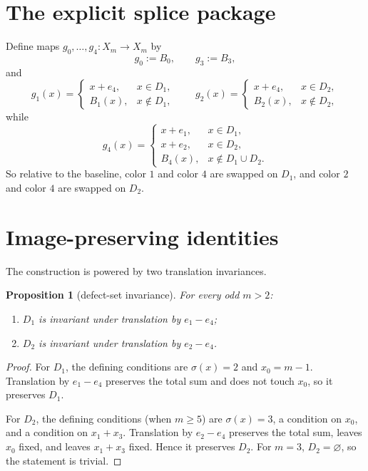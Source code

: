 \documentclass[11pt]{article}
\newtheorem{proposition}[theorem]{Proposition}
\begin{document}
\section{The explicit splice package}
Define maps \(g_0,\dots,g_4\colon X_m\to X_m\) by
\[
g_0:=B_0,\qquad g_3:=B_3,
\]
and
\[
g_1(x)=
\begin{cases}
x+e_4, & x\in D_1,\\
B_1(x), & x\notin D_1,
\end{cases}
\qquad
g_2(x)=
\begin{cases}
x+e_4, & x\in D_2,\\
B_2(x), & x\notin D_2,
\end{cases}
\]
while
\[
g_4(x)=
\begin{cases}
x+e_1, & x\in D_1,\\
x+e_2, & x\in D_2,\\
B_4(x), & x\notin D_1\cup D_2.
\end{cases}
\]
So relative to the baseline, color \(1\) and color \(4\) are swapped on \(D_1\),
and color \(2\) and color \(4\) are swapped on \(D_2\).

\section{Image-preserving identities}
The construction is powered by two translation invariances.

\begin{proposition}[defect-set invariance]
\label{prop:defect-invariance}
For every odd \(m>2\):
\begin{enumerate}[label=\textup{(\arabic*)},leftmargin=2.8em]
\item \(D_1\) is invariant under translation by \(e_1-e_4\);
\item \(D_2\) is invariant under translation by \(e_2-e_4\).
\end{enumerate}
\end{proposition}

\begin{proof}
For \(D_1\), the defining conditions are \(\sigma(x)=2\) and \(x_0=m-1\).
Translation by \(e_1-e_4\) preserves the total sum and does not touch \(x_0\),
so it preserves \(D_1\).

For \(D_2\), the defining conditions (when \(m\ge 5\)) are
\(\sigma(x)=3\), a condition on \(x_0\), and a condition on
\(x_1+x_3\).
Translation by \(e_2-e_4\) preserves the total sum, leaves \(x_0\) fixed, and
leaves \(x_1+x_3\) fixed.
Hence it preserves \(D_2\).
For \(m=3\), \(D_2=\varnothing\), so the statement is trivial.
\end{proof}
\end{document}
